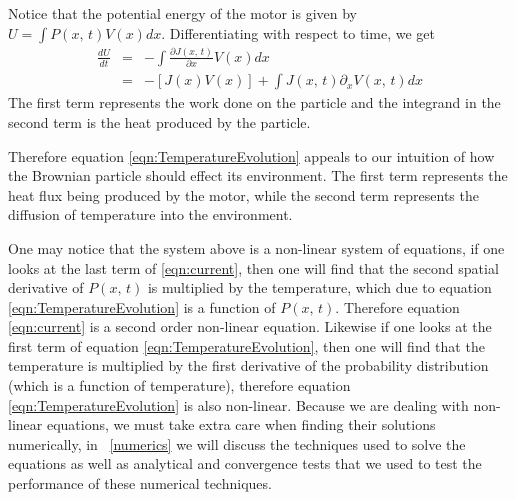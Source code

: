 Notice that the potential energy of the motor is given by $U = \int P(x, \, t) V(x) dx$. Differentiating with respect to time, we get
\begin{eqnarray}
\frac{d U}{d t} &=& -\int \frac{\partial J(x, \, t)}{\partial x} V(x) dx \\
		        &=& -[J(x) V(x)] + \int J(x, \, t) \partial_x V(x, \, t) dx
\end{eqnarray}
The first term represents the work done on the particle and the integrand in the second term is the heat produced by the particle.

Therefore equation \ref{eqn:TemperatureEvolution} appeals to our intuition of how the Brownian particle should effect its environment. The first term represents the heat flux being produced by the motor, while the second term represents the diffusion of temperature into the environment.

One may notice that the system above is a non-linear system of equations, if one looks at the last term of \ref{eqn:current}, then one will find that the second spatial derivative of $P(x, \, t)$ is multiplied by the temperature, which due to equation \ref{eqn:TemperatureEvolution} is a function of $P(x, \, t)$. Therefore equation \ref{eqn:current} is a second order non-linear equation. Likewise if one looks at the first term of equation \ref{eqn:TemperatureEvolution}, then one will find that the temperature is multiplied by the first derivative of the probability distribution (which is a function of temperature), therefore equation \ref{eqn:TemperatureEvolution} is also non-linear. Because we are dealing with non-linear equations, we must take extra care when finding their solutions numerically, in ~\autoref{numerics} we will discuss the techniques used to solve the equations as well as analytical and convergence tests that we used to test the performance of these numerical techniques.

